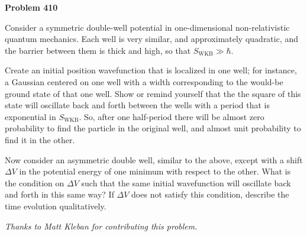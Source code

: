 \documentclass[12pt]{article}
\begin{document}
\begin{pottproblem}
\textbf{Problem 410}

Consider a symmetric double-well potential in one-dimensional non-relativistic
quantum mechanics.  Each well is very similar, and approximately quadratic, and the
barrier between them is thick and high, so that $S_\mathrm{WKB} \gg
\hbar$.

Create an initial position wavefunction that is localized
in one well; for instance, a Gaussian centered on one well with a
width corresponding to the would-be ground state of that one well.
Show or remind yourself
that the the square of this state will oscillate back and forth
between the wells with a period that is exponential in $S_\mathrm{WKB}$.
So, after one half-period there will be almost zero probability to
find the particle in the original well, and almost unit probability to find it in
the other.

Now consider an asymmetric double well, similar to the above, except
with a shift $\Delta V$ in the potential energy of one minimum with
respect to the other.  What is the condition on $\Delta V$ such that
the same initial wavefunction will oscillate back and forth in this
same way?  If $\Delta V$ does not satisfy this condition, describe the
time evolution qualitatively.

{\normalsize\emph{Thanks to Matt Kleban for contributing this problem.}}
\end{pottproblem}
\end{document}
